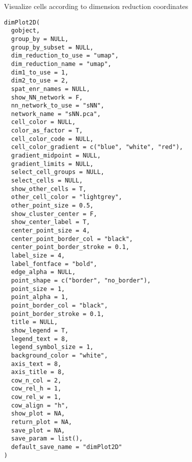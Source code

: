 \documentclass[a4paper]{book}
\begin{document}
%
\begin{Description}\relax
Visualize cells according to dimension reduction coordinates
\end{Description}
%
\begin{Usage}
\begin{verbatim}
dimPlot2D(
  gobject,
  group_by = NULL,
  group_by_subset = NULL,
  dim_reduction_to_use = "umap",
  dim_reduction_name = "umap",
  dim1_to_use = 1,
  dim2_to_use = 2,
  spat_enr_names = NULL,
  show_NN_network = F,
  nn_network_to_use = "sNN",
  network_name = "sNN.pca",
  cell_color = NULL,
  color_as_factor = T,
  cell_color_code = NULL,
  cell_color_gradient = c("blue", "white", "red"),
  gradient_midpoint = NULL,
  gradient_limits = NULL,
  select_cell_groups = NULL,
  select_cells = NULL,
  show_other_cells = T,
  other_cell_color = "lightgrey",
  other_point_size = 0.5,
  show_cluster_center = F,
  show_center_label = T,
  center_point_size = 4,
  center_point_border_col = "black",
  center_point_border_stroke = 0.1,
  label_size = 4,
  label_fontface = "bold",
  edge_alpha = NULL,
  point_shape = c("border", "no_border"),
  point_size = 1,
  point_alpha = 1,
  point_border_col = "black",
  point_border_stroke = 0.1,
  title = NULL,
  show_legend = T,
  legend_text = 8,
  legend_symbol_size = 1,
  background_color = "white",
  axis_text = 8,
  axis_title = 8,
  cow_n_col = 2,
  cow_rel_h = 1,
  cow_rel_w = 1,
  cow_align = "h",
  show_plot = NA,
  return_plot = NA,
  save_plot = NA,
  save_param = list(),
  default_save_name = "dimPlot2D"
)
\end{verbatim}
\end{Usage}
%
\end{document}
